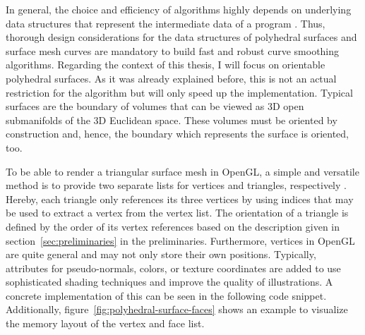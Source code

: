 \documentclass{stdlocal}
\begin{document}
  In general, the choice and efficiency of algorithms highly depends on underlying data structures that represent the intermediate data of a program \autocite{knuth1997,mehlhorn2008,smed2006}.
  Thus, thorough design considerations for the data structures of polyhedral surfaces and surface mesh curves are mandatory to build fast and robust curve smoothing algorithms.
  Regarding the context of this thesis, I will focus on orientable polyhedral surfaces.
  As it was already explained before, this is not an actual restriction for the algorithm but will only speed up the implementation.
  Typical surfaces are the boundary of volumes that can be viewed as 3D open submanifolds of the 3D Euclidean space.
  These volumes must be oriented by construction and, hence, the boundary which represents the surface is oriented, too.

  To be able to render a triangular surface mesh in OpenGL, a simple and versatile method is to provide two separate lists for vertices and triangles, respectively \autocite{opengl}.
  Hereby, each triangle only references its three vertices by using indices that may be used to extract a vertex from the vertex list.
  The orientation of a triangle is defined by the order of its vertex references based on the description given in section~\ref{sec:preliminaries} in the preliminaries.
  Furthermore, vertices in OpenGL are quite general and may not only store their own positions.
  Typically, attributes for pseudo-normals, colors, or texture coordinates are added to use sophisticated shading techniques and improve the quality of illustrations.
  A concrete implementation of this can be seen in the following code snippet.
  Additionally, figure~\ref{fig:polyhedral-surface-faces} shows an example to visualize the memory layout of the vertex and face list.
\end{document}
